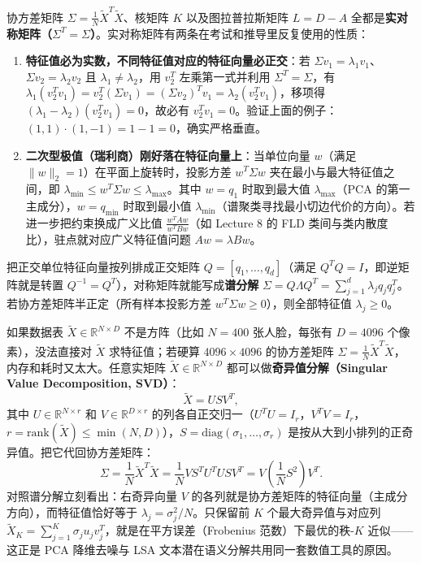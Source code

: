 

协方差矩阵 \(\Sigma = \frac{1}{N}\tilde{X}^T\tilde{X}\)、核矩阵 \(K\) 以及图拉普拉斯矩阵 \(L = D - A\) 全都是\textbf{实对称矩阵（\(\Sigma^T = \Sigma\)）}。实对称矩阵有两条在考试和推导里反复使用的性质：
\begin{enumerate}[start=1]
\item \textbf{特征值必为实数，不同特征值对应的特征向量必正交}：若 \(\Sigma v_1 = \lambda_1 v_1\)、\(\Sigma v_2 = \lambda_2 v_2\) 且 \(\lambda_1 \neq \lambda_2\)，用 \(v_2^T\) 左乘第一式并利用 \(\Sigma^T = \Sigma\)，有 \(\lambda_1 (v_2^T v_1) = v_2^T (\Sigma v_1) = (\Sigma v_2)^T v_1 = \lambda_2 (v_2^T v_1)\)，移项得 \((\lambda_1 - \lambda_2)(v_2^T v_1) = 0\)，故必有 \(v_2^T v_1 = 0\)。验证上面的例子：\((1, 1)\cdot(1, -1) = 1 - 1 = 0\)，确实严格垂直。
\item \textbf{二次型极值（瑞利商）刚好落在特征向量上}：当单位向量 \(w\)（满足 \(\|w\|_2 = 1\)）在平面上旋转时，投影方差 \(w^T \Sigma w\) 夹在最小与最大特征值之间，即 \(\lambda_{\min} \le w^T \Sigma w \le \lambda_{\max}\)。其中 \(w = q_1\) 时取到最大值 \(\lambda_{\max}\)（PCA 的第一主成分），\(w = q_{\min}\) 时取到最小值 \(\lambda_{\min}\)（谱聚类寻找最小切边代价的方向）。若进一步把约束换成广义比值 \(\frac{w^T A w}{w^T B w}\)（如 Lecture 8 的 FLD 类间与类内散度比），驻点就对应广义特征值问题 \(A w = \lambda B w\)。
\end{enumerate}


把正交单位特征向量按列排成正交矩阵 \(Q = [q_1, \dots, q_d]\)（满足 \(Q^T Q = I\)，即逆矩阵就是转置 \(Q^{-1} = Q^T\)），对称矩阵就能写成\textbf{谱分解} \(\Sigma = Q \Lambda Q^T = \sum_{j=1}^d \lambda_j q_j q_j^T\)。若协方差矩阵半正定（所有样本投影方差 \(w^T \Sigma w \ge 0\)），则全部特征值 \(\lambda_j \ge 0\)。




如果数据表 \(\tilde{X} \in \mathbb{R}^{N \times D}\) 不是方阵（比如 \(N = 400\) 张人脸，每张有 \(D = 4096\) 个像素），没法直接对 \(\tilde{X}\) 求特征值；若硬算 \(4096 \times 4096\) 的协方差矩阵 \(\Sigma = \frac{1}{N}\tilde{X}^T\tilde{X}\)，内存和耗时又太大。任意实矩阵 \(\tilde{X} \in \mathbb{R}^{N \times D}\) 都可以做\textbf{奇异值分解（Singular Value Decomposition, SVD）}：
\[
\tilde{X} = U S V^T,
\]
其中 \(U \in \mathbb{R}^{N \times r}\) 和 \(V \in \mathbb{R}^{D \times r}\) 的列各自正交归一（\(U^T U = I_r\)，\(V^T V = I_r\)，\(r = \mathrm{rank}(\tilde{X}) \le \min(N, D)\)），\(S = \mathrm{diag}(\sigma_1, \dots, \sigma_r)\) 是按从大到小排列的正奇异值。把它代回协方差矩阵：
\[
\Sigma = \frac{1}{N}\tilde{X}^T \tilde{X} = \frac{1}{N} V S^T U^T U S V^T = V \left(\frac{1}{N} S^2\right) V^T.
\]
对照谱分解立刻看出：右奇异向量 \(V\) 的各列就是协方差矩阵的特征向量（主成分方向），而特征值恰好等于 \(\lambda_j = \sigma_j^2 / N\)。只保留前 \(K\) 个最大奇异值与对应列 \(\tilde{X}_K = \sum_{j=1}^K \sigma_j u_j v_j^T\)，就是在平方误差（Frobenius 范数）下最优的秩-\(K\) 近似——这正是 PCA 降维去噪与 LSA 文本潜在语义分解共用同一套数值工具的原因。


